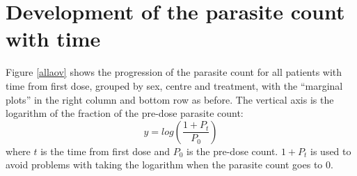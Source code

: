 \section{Development of the parasite count with time}
Figure \ref{allaov} shows the progression of the parasite count for all patients with time from first dose, grouped by sex, centre and treatment, with the ``marginal plots'' in the right column and bottom row as before. The vertical axis is the logarithm of the fraction of the pre-dose parasite count:
$$y=log\left(\frac{1+P_t}{P_0}\right)$$
where $t$ is the time from first dose and $P_0$ is the pre-dose count. $1+P_t$ is used to avoid problems with taking the logarithm when the parasite count goes to 0.

